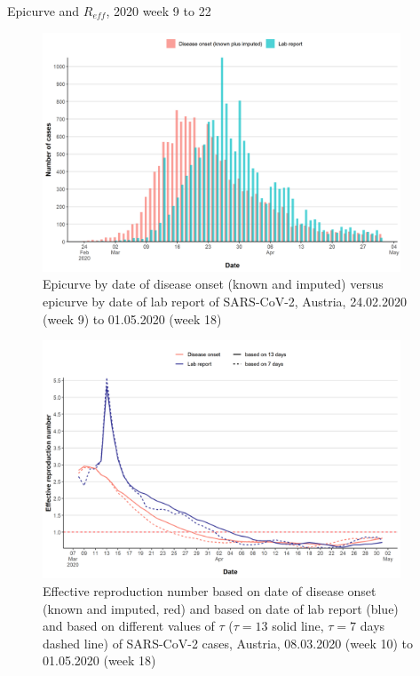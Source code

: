 \documentclass[
  ignorenonframetext,
  aspectratio=169,
]{beamer}
\newcommand{\mli}[1]{\mathit{#1}}%
\begin{document}
\begin{frame}{Epicurve and \(R_\mli{eff}\), 2020 week 9 to 22}
\protect\hypertarget{epicurve-and-r_mlieff-2020-week-9-to-22}{}
\begin{minipage}{.45\textwidth}

\begin{figure}
  \centering
  \includegraphics[width=0.95\textwidth,keepaspectratio]{img/epicurve_compare_imputed_phase1.png}
  \caption{Epicurve by date of disease onset (known and imputed) versus epicurve by date of lab report of SARS-CoV-2, Austria, 24.02.2020 (week 9) to 01.05.2020 (week 18)}
\end{figure}

\end{minipage}
\begin{minipage} {.45\textwidth}

\begin{figure}
  \centering
  \includegraphics[width=0.95\textwidth,keepaspectratio]{img/r_eff_compare_phase1.png}
  \caption{Effective reproduction number based on date of disease onset (known and imputed, red) and based on date of lab report (blue) and based on different values of $\tau$ ($\tau = 13$ solid line, $\tau = 7$ days dashed line) of SARS-CoV-2 cases, Austria, 08.03.2020 (week 10) to 01.05.2020 (week 18)}
\end{figure}

\end{minipage}
\end{frame}
\end{document}
